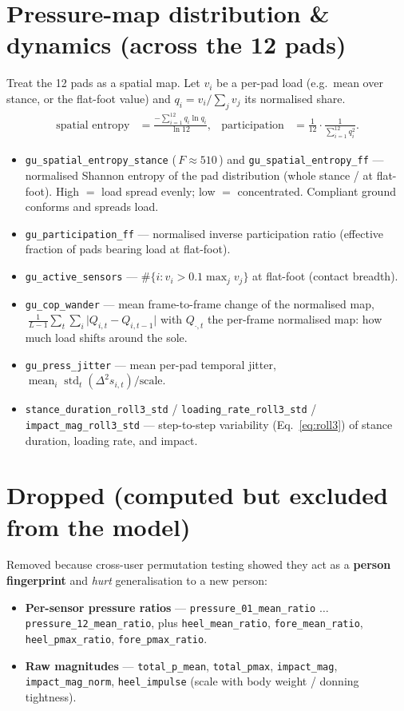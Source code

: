 \documentclass[11pt]{article}
\newcommand{\code}[1]{\texttt{#1}}
\newcommand{\Fval}[1]{{\small(\,$F\!\approx\!#1$\,)}}
\begin{document}
\section{Pressure-map distribution \& dynamics (across the 12 pads)}
Treat the 12 pads as a spatial map. Let $v_i$ be a per-pad load (e.g.\ mean over stance, or the
flat-foot value) and $q_i=v_i/\sum_j v_j$ its normalised share.
\begin{align}
\text{spatial entropy} &= \frac{-\sum_{i=1}^{12} q_i\ln q_i}{\ln 12}, &
\text{participation} &= \frac{1}{12}\cdot\frac{1}{\sum_{i=1}^{12} q_i^{2}} .
\end{align}
\begin{itemize}
  \item \code{gu_spatial_entropy_stance} \Fval{510} and \code{gu_spatial_entropy_ff} --- normalised
  Shannon entropy of the pad distribution (whole stance / at flat-foot). High $=$ load spread
  evenly; low $=$ concentrated. Compliant ground conforms and spreads load.
  \item \code{gu_participation_ff} --- normalised inverse participation ratio (effective fraction of
  pads bearing load at flat-foot).
  \item \code{gu_active_sensors} --- $\#\{i: v_i>0.1\max_j v_j\}$ at flat-foot (contact breadth).
  \item \code{gu_cop_wander} --- mean frame-to-frame change of the normalised map,
  $\ \tfrac1{L-1}\sum_t\sum_i \lvert Q_{i,t}-Q_{i,t-1}\rvert$ with $Q_{\cdot,t}$ the per-frame
  normalised map: how much load shifts around the sole.
  \item \code{gu_press_jitter} --- mean per-pad temporal jitter,
  $\operatorname{mean}_i \operatorname{std}_t(\Delta^2 s_{i,t})/\text{scale}$.
  \item \code{stance_duration_roll3_std} / \code{loading_rate_roll3_std} /
  \code{impact_mag_roll3_std} --- step-to-step variability (Eq.~\eqref{eq:roll3}) of stance
  duration, loading rate, and impact.
\end{itemize}

\section*{Dropped (computed but excluded from the model)}
Removed because cross-user permutation testing showed they act as a \textbf{person fingerprint} and
\emph{hurt} generalisation to a new person:
\begin{itemize}
  \item \textbf{Per-sensor pressure ratios} --- \code{pressure_01_mean_ratio} $\dots$
  \code{pressure_12_mean_ratio}, plus \code{heel_mean_ratio}, \code{fore_mean_ratio},
  \code{heel_pmax_ratio}, \code{fore_pmax_ratio}.
  \item \textbf{Raw magnitudes} --- \code{total_p_mean}, \code{total_pmax}, \code{impact_mag},
  \code{impact_mag_norm}, \code{heel_impulse} (scale with body weight / donning tightness).
\end{itemize}
\end{document}
